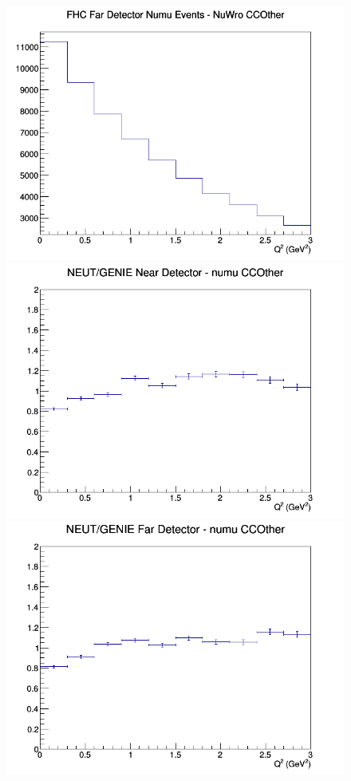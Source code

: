 \documentclass[12pt]{article}
\begin{document}
\begin{figure}[h]
\endminipage
{}
\includegraphics[width=\linewidth]{eff_Q2/GAr/CCOther_FHC_FD_numu_Q2_NuWro.png}
\endminipage
\newline
{}
\includegraphics[width=\linewidth]{eff_Q2/GAr/ratios/CCOther_NEUT_GENIE_numu_near_Q2.png}
\endminipage
{}
\includegraphics[width=\linewidth]{eff_Q2/GAr/ratios/CCOther_NEUT_GENIE_numu_far_Q2.png}

\end{figure}
\end{document}
